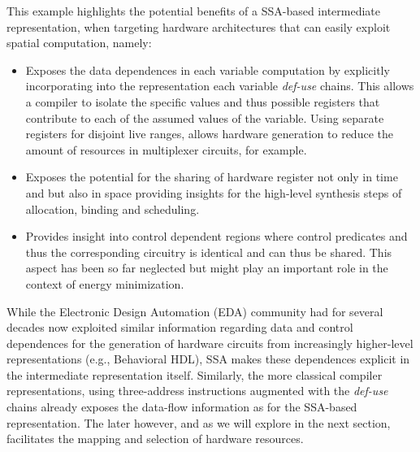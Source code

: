 This example highlights the potential benefits of a SSA-based intermediate representation, when
targeting hardware architectures that can easily exploit spatial
computation, namely:\\
\begin{itemize}
\item Exposes the data dependences in each variable computation
by explicitly  incorporating into the representation each variable
{\em def-use} chains.  This allows a compiler to isolate the
specific values and thus possible registers that  contribute to
each of the assumed values of the variable. Using separate registers for disjoint live ranges, allows hardware generation
to  reduce the amount of resources in multiplexer circuits, for example.
\item Exposes the potential for the sharing of hardware register not only in 
time and but also in space providing insights for the high-level synthesis
steps of allocation, binding and scheduling.
\item Provides insight into control dependent regions where control 
predicates and thus the corresponding circuitry is identical and can
thus be shared. This aspect has been so far neglected but might
play an important role in the context of energy minimization. \\
\end{itemize}

While the Electronic Design Automation (EDA) community had for
several decades now exploited similar information regarding data
and control dependences for the generation of hardware circuits
from increasingly higher-level representations 
(e.g., Behavioral HDL), SSA makes these dependences
explicit in the intermediate representation  itself.
Similarly, the more classical compiler representations, using three-address 
instructions augmented with the {\em def-use} chains already exposes the data-flow 
information as for the SSA-based representation. The later however,
and as we will explore in the next section, facilitates the mapping and 
selection of hardware resources.\\


